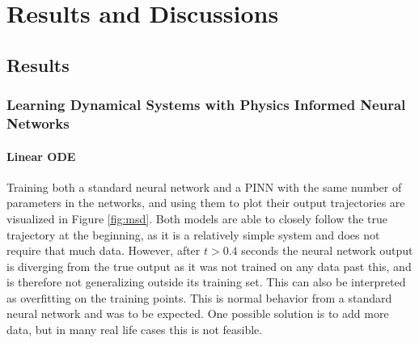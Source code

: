 \chapter{Results and Discussions} \label{chap:results}

\section{Results}


\subsection{Learning Dynamical Systems with Physics Informed Neural Networks}

\subsubsection{Linear ODE}

Training both a standard neural network and a PINN with the same number of parameters in the networks, and using them to plot their output trajectories are visualized in Figure \ref{fig:msd}. Both models are able to closely follow the true trajectory at the beginning, as it is a relatively simple system and does not require that much data. However, after $t > 0.4$ seconds the neural network output is diverging from the true output as it was not trained on any data past this, and is therefore not generalizing outside its training set. This can also be interpreted as overfitting on the training points. This is normal behavior from a standard neural network and was to be expected. One possible solution is to add more data, but in many real life cases this is not feasible.

